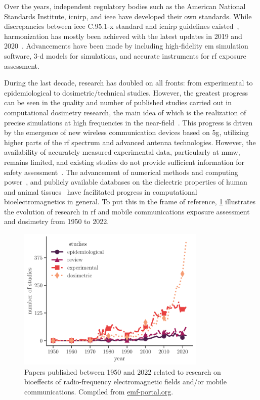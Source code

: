 Over the years, independent regulatory bodies such as the American National Standards Institute, \gls{icnirp}, and \gls{ieee} have developed their own standards.
While discrepancies between \gls{ieee} C.95.1-x standard and \gls{icnirp} guidelines existed~\cite{Repacholi2017history}, harmonization has mostly been achieved with the latest updates in 2019 and 2020~\cite{Foster2022Three}.
Advancements have been made by including high-fidelity \gls{em} simulation software, \gls{3-d} models for simulations, and accurate instruments for \gls{rf} exposure assessment.

During the last decade, research has doubled on all fronts: from experimental to epidemiological to dosimetric/technical studies.
However, the greatest progress can be seen in the quality and number of published studies carried out in computational dosimetry research, the main idea of which is the realization of precise simulations at high frequencies in the near-field~\cite{Diao2021Effect}.
This progress is driven by the emergence of new wireless communication devices based on \gls{5g}, utilizing higher parts of the \gls{rf} spectrum and advanced antenna technologies.
However, the availability of accurately measured experimental data, particularly at \gls{mmw}, remains limited, and existing studies do not provide sufficient information for safety assessment~\cite{Simkó20195G}.
The advancement of numerical methods and computing power~\cite{Poljak2018conformal}, and publicly available databases on the dielectric properties of human and animal tissues~\cite{Gabriel1996Compilation} have facilitated progress in computational bioelectromagnetics in general.
To put this in the frame of reference, \cref{fig:research_compilation} illustrates the evolution of research in \gls{rf} and mobile communications exposure assessment and dosimetry from 1950 to 2022.
\begin{figure}[t]
    \centering
    \includegraphics[width=0.8\textwidth]{artwork/research_compilation.pdf}
    \caption{Papers published between 1950 and 2022 related to research on bioeffects of radio-frequency electromagnetic fields and/or mobile communications.
    Compiled from \href{http://www.emf-portal.org}{\url{emf-portal.org}}.}
    \label{fig:research_compilation}
\end{figure}


